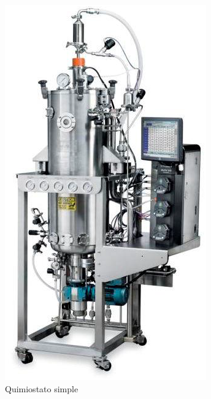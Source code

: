     \begin{minipage}{0.3\linewidth}
        \begin{figure}
            \centering
            \includegraphics[width=\textwidth]{img/fotos/quimiostato_simple.png}
            \caption{Quimiostato simple}
            \label{fig:quimiostato_simple_foto}
        \end{figure}
    \end{minipage}
